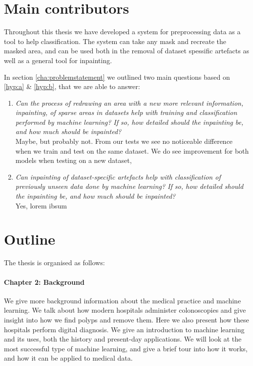 \section{Main contributors}
Throughout this thesis we have developed a system for preprocessing data as a tool to help classification. 
The system can take any mask and recreate the masked area, and can be used both in the removal of dataset spessific artefacts as well as a general tool for inpainting. 

In section \ref{cha:problemstatement} we outlined two main questions based on \ref{hyp:a} \& \ref{hyp:b}, that we are able to answer:
\begin{enumerate}


\item \textit{Can the process of redrawing an area with a new more relevant information, inpainting, of sparse areas in datasets help with training and classification performed by machine learning? If so, how detailed should the inpainting be, and how much should be inpainted?}\\

Maybe, but probably not. From our tests we see no noticeable difference when we train and test on the same dataset. We do see improvement for both models when testing on a new dataset, 

\item \textit{Can inpainting of dataset-specific artefacts help with classification of previously unseen data done by machine learning? If so, how detailed should the inpainting be, and how much should be inpainted?}\\
Yes, lorem ibsum


\end{enumerate}


\section{Outline}
The thesis is organised as follows:

\paragraph{Chapter 2: Background}
We give more background information about the medical practice and machine learning.
We talk about how modern hospitals administer colonoscopies and give insight into how we find polyps and remove them. Here we also present how these hospitals perform digital diagnosis.  
We give an introduction to machine learning and its uses, both the history and present-day applications. We will look at the most successful type of machine learning, and give a brief tour into how it works, and how it can be applied to medical data.

